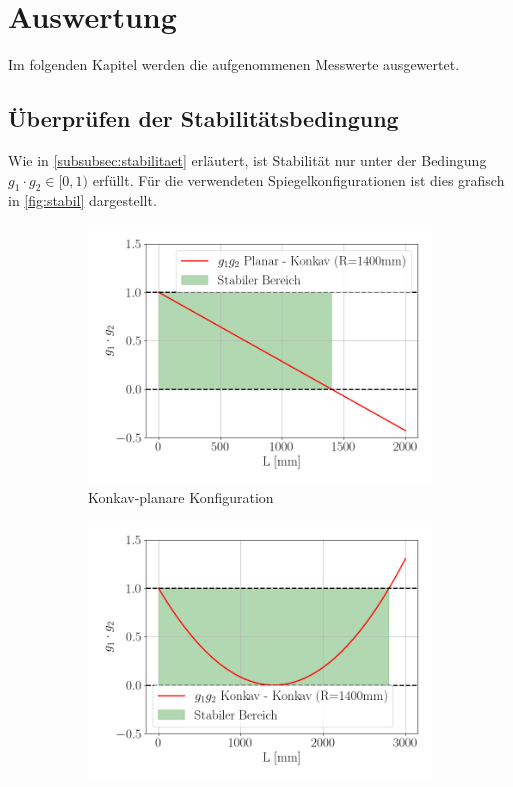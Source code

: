 \section{Auswertung}\label{sec:auswertung}
Im folgenden Kapitel werden die aufgenommenen Messwerte ausgewertet.
\subsection{Überprüfen der Stabilitätsbedingung}
Wie in \autoref{subsubsec:stabilitaet} erläutert, ist Stabilität nur unter der Bedingung $g_1\cdot g_2\in[0,1)$ erfüllt. Für die verwendeten Spiegelkonfigurationen ist dies grafisch in \autoref{fig:stabil} dargestellt.
\begin{figure}[H]
    \centering
    \begin{subfigure}[b]{0.48\textwidth}
        \centering
        \includegraphics[scale=0.4]{Skripte/2000.png}
        \caption{Konkav-planare Konfiguration}
        \label{fig:kette_a}
    \end{subfigure}
    \hfill
    \begin{subfigure}[b]{0.48\textwidth}
        \centering
        \includegraphics[scale=0.4]{Skripte/3000.png}

\end{subfigure}
\end{figure}

